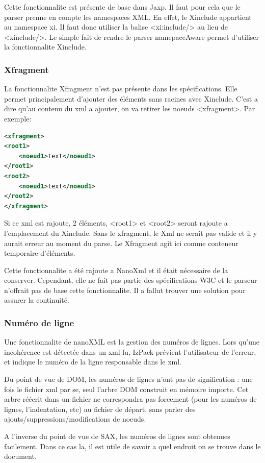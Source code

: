 Cette fonctionnalite est présente de base dans Jaxp. Il faut pour cela que le parser prenne en compte les namespaces XML. En effet, le Xinclude appartient au namespace xi. Il faut donc utiliser la balise <xi:include/> au lieu de <xinclude/>. Le simple fait de rendre le parser namepaceAware permet d'utiliser la fonctionnalite Xinclude. 

\subsubsection{Xfragment}
La fonctionnalite Xfragment n'est pas présente dans les spécifications. Elle permet principalement d'ajouter des éléments sans racines avec Xinclude. C'est a dire qu'au contenu du xml a ajouter, on va retirer les noeuds <xfragment>. Par exemple: 
\begin{lstlisting}[language=xml]
<xfragment>
<root1>
	<noeud1>text</noeud1>
</root1>
<root2>
	<noeud1>text</noeud1>
</root2>
</xfragment>
\end{lstlisting}
Si ce xml est rajoute, 2 éléments, <root1> et <root2> seront rajoute a l'emplacement du Xinclude. Sans le xfragment, le Xml ne serait pas valide et il y aurait erreur au moment du parse. Le Xfragment agit ici comme conteneur temporaire d'éléments.

Cette fonctionnalite a été rajoute a NanoXml et il était nécessaire de la conserver. Cependant, elle ne fait pas partie des spécifications W3C et le parseur n'offrait pas de base cette fonctionnalite. Il a fallut trouver une solution pour assurer la continuité.
\subsubsection{Numéro de ligne}
Une fonctionnalite de nanoXML est la gestion des numéros de lignes. Lors qu'une incohérence est détectée dans un xml lu, IzPack prévient l'utilisateur de l'erreur, et indique le numéro de la ligne responsable dans le xml.

Du point de vue de DOM, les numéros de lignes n'ont pas de signification : une fois le fichier xml par se, seul l'arbre DOM construit en mémoire importe. Cet arbre réécrit dans un fichier ne correspondra pas forcement (pour les numéros de lignes, l'indentation, etc) au fichier de départ, sans parler des ajouts/suppressions/modifications de noeuds.

A l'inverse du point de vue de SAX, les numéros de lignes sont obtenues facilement. Dans ce cas la, il est utile de savoir a quel endroit on se trouve dans le document.

